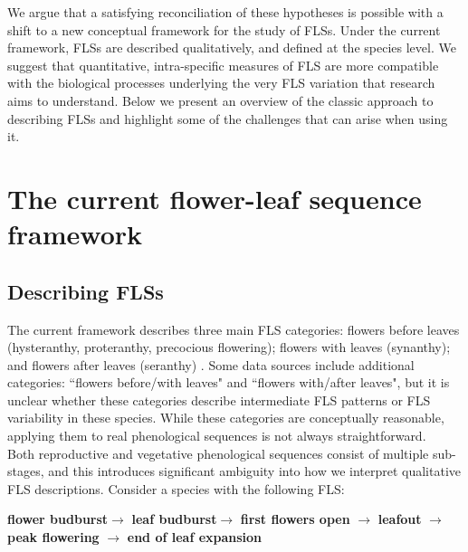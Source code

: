 \documentclass[12pt]{article}
\begin{document}
\noindent We argue that a satisfying reconciliation of these hypotheses is possible with a shift to a new conceptual framework for the study of FLSs. Under the current framework, FLSs are described qualitatively, and defined at the species level. We suggest that quantitative, intra-specific measures of FLS are more compatible with the biological processes underlying the very FLS variation that research aims to understand. Below we present an overview of the classic approach to describing FLSs and highlight some of the challenges that can arise when using it. \\

\section*{The current flower-leaf sequence framework}
\subsection*{Describing FLSs}
\noindent  The current framework describes three main FLS categories: flowers before leaves (hysteranthy, proteranthy, precocious flowering); flowers with leaves (synanthy); and flowers after leaves (seranthy) \citep{Lamont2011, Heinig1899}. Some data sources \citep[e.g.][]{Burns1990,Barnes2004} include additional categories: ``flowers before/with leaves" and ``flowers with/after leaves", but it is unclear whether these categories describe intermediate FLS patterns or FLS variability in these species. While these categories are conceptually reasonable, applying them to real phenological sequences is not always straightforward.\\

\noindent Both reproductive and vegetative phenological sequences consist of multiple sub-stages, and this introduces significant ambiguity into how we interpret qualitative FLS descriptions. Consider a species with the following FLS:\\

\begin{center}
\textbf{flower budburst}$\rightarrow$ \textbf{leaf budburst}$\rightarrow$ \textbf{first flowers open} $\rightarrow$ \textbf{leafout} $\rightarrow$ \textbf{peak flowering} $\rightarrow$ \textbf{end of leaf expansion} \\
\end{center}
\end{document}
